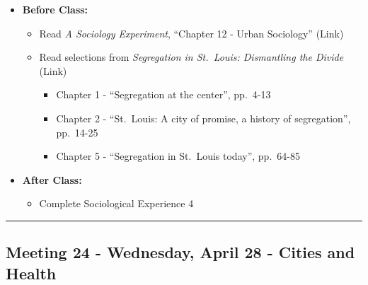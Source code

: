\documentclass[
]{book}
\providecommand{\tightlist}{%
  \setlength{\itemsep}{0pt}\setlength{\parskip}{0pt}}
\begin{document}
\begin{itemize}
\tightlist
\item
  \textbf{Before Class:}

  \begin{itemize}
  \tightlist
  \item
    Read \emph{A Sociology Experiment}, ``Chapter 12 - Urban Sociology'' (Link)
  \item
    Read selections from \emph{Segregation in St.~Louis: Dismantling the Divide} (Link)

    \begin{itemize}
    \tightlist
    \item
      Chapter 1 - ``Segregation at the center'', pp.~4-13
    \item
      Chapter 2 - ``St.~Louis: A city of promise, a history of segregation'', pp.~14-25
    \item
      Chapter 5 - ``Segregation in St.~Louis today'', pp.~64-85
    \end{itemize}
  \end{itemize}
\item
  \textbf{After Class:}

  \begin{itemize}
  \tightlist
  \item
    Complete Sociological Experience 4
  \end{itemize}
\end{itemize}

\begin{center}\rule{0.5\linewidth}{0.5pt}\end{center}

\hypertarget{meeting-24---wednesday-april-28---cities-and-health}{%
\subsection*{Meeting 24 - Wednesday, April 28 - Cities and Health}\label{meeting-24---wednesday-april-28---cities-and-health}}
\end{document}
